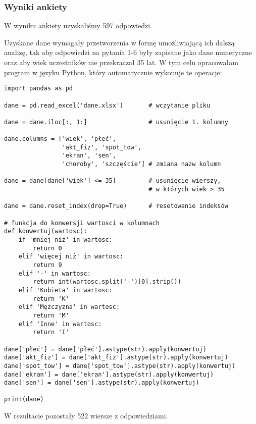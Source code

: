\documentclass[12pt,a4paper]{article}
\begin{document}
\newpage
\subsubsection{Wyniki ankiety}
W wyniku ankiety uzyskaliśmy 597 odpowiedzi.

\vspace{2mm}
Uzyskane dane wymagały przetworzenia w formę umożliwiającą ich dalszą analizę, tak aby odpowiedzi na pytania 1-6 były zapisane jako dane numeryczne oraz aby wiek uczestników nie przekraczał 35 lat. W tym celu opracowałam program w języku Python, który automatycznie wykonuje te operacje:

\vspace{3mm}
\begin{lstlisting}
import pandas as pd

dane = pd.read_excel('dane.xlsx')       # wczytanie pliku

dane = dane.iloc[:, 1:]                 # usunięcie 1. kolumny

dane.columns = ['wiek', 'płeć', 
                'akt_fiz', 'spot_tow',
                'ekran', 'sen', 
                'choroby', 'szczęście'] # zmiana nazw kolumn

dane = dane[dane['wiek'] <= 35]         # usunięcie wierszy, 
                                        # w których wiek > 35

dane = dane.reset_index(drop=True)      # resetowanie indeksów

# funkcja do konwersji wartosci w kolumnach
def konwertuj(wartosc):
    if 'mniej niż' in wartosc:
        return 0
    elif 'więcej niż' in wartosc:
        return 9
    elif '-' in wartosc:
        return int(wartosc.split('-')[0].strip())
    elif 'Kobieta' in wartosc:
        return 'K'
    elif 'Mężczyzna' in wartosc:
        return 'M'
    elif 'Inne' in wartosc:
        return 'I'

dane['płeć'] = dane['płeć'].astype(str).apply(konwertuj)
dane['akt_fiz'] = dane['akt_fiz'].astype(str).apply(konwertuj)
dane['spot_tow'] = dane['spot_tow'].astype(str).apply(konwertuj)
dane['ekran'] = dane['ekran'].astype(str).apply(konwertuj)
dane['sen'] = dane['sen'].astype(str).apply(konwertuj)

print(dane)
\end{lstlisting}

\newpage W rezultacie pozostały 522 wiersze z odpowiedziami.
\end{document}
